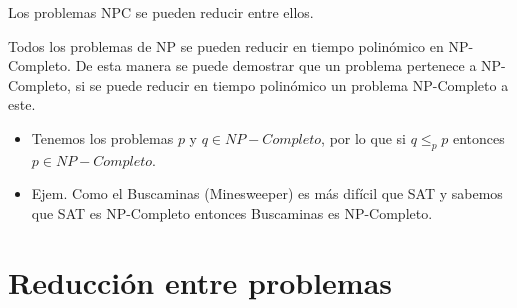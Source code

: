 Los problemas NPC se pueden reducir entre ellos.

Todos los problemas de NP se pueden reducir en tiempo polinómico en NP-Completo. De esta manera se puede demostrar que un problema pertenece a NP-Completo, si se puede reducir en tiempo polinómico un problema NP-Completo a este.
\begin{itemize}
  \item Tenemos los problemas $p$ y $ q\in NP-Completo$, por lo que si $q \leq_p p$ entonces $p \in NP-Completo$.
  \item Ejem. Como el Buscaminas (Minesweeper) es más difícil que SAT y sabemos que SAT es NP-Completo entonces Buscaminas es NP-Completo.
\end{itemize}

\section{Reducción entre problemas}
